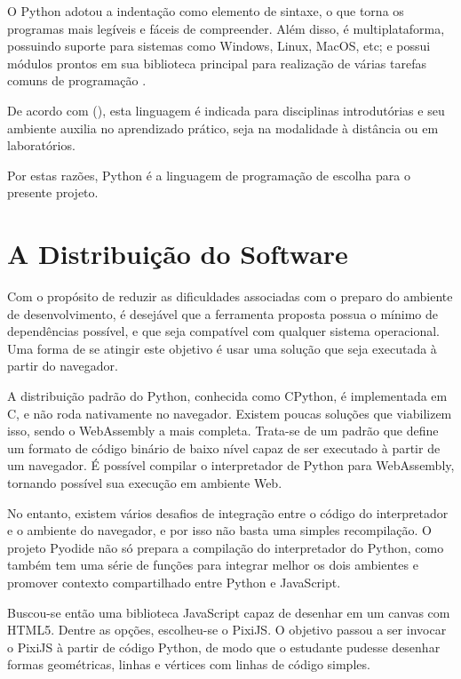 O Python adotou a indentação como elemento de sintaxe, o que torna os programas mais legíveis e fáceis de compreender. Além disso, é multiplataforma, possuindo suporte para sistemas como Windows, Linux, MacOS, etc; e possui módulos prontos em sua biblioteca principal para realização de várias tarefas comuns de programação \cite{moraispires2002}.

De acordo com \citeauthor{fangohr2004} (\citeyear{fangohr2004}), esta linguagem é indicada para disciplinas introdutórias e seu ambiente auxilia no aprendizado prático, seja na modalidade à distância ou em laboratórios.

Por estas razões, Python é a linguagem de programação de escolha para o presente projeto.

\section{A Distribuição do Software}

Com o propósito de reduzir as dificuldades associadas com o preparo do ambiente de desenvolvimento, é desejável que a ferramenta proposta possua o mínimo de dependências possível, e que seja compatível com qualquer sistema operacional. Uma forma de se atingir este objetivo é usar uma solução que seja executada à partir do navegador.

A distribuição padrão do Python, conhecida como CPython, é implementada em C, e não roda nativamente no navegador. Existem poucas soluções que viabilizem isso, sendo o WebAssembly a mais completa. Trata-se de um padrão que define um formato de código binário de baixo nível capaz de ser executado à partir de um navegador. É possível compilar o interpretador de Python para WebAssembly, tornando possível sua execução em ambiente Web.

No entanto, existem vários desafios de integração entre o código do interpretador e o ambiente do navegador, e por isso não basta uma simples recompilação. O projeto Pyodide não só prepara a compilação do interpretador do Python, como também tem uma série de funções para integrar melhor os dois ambientes e promover contexto compartilhado entre Python e JavaScript.

Buscou-se então uma biblioteca JavaScript capaz de desenhar em um canvas com HTML5. Dentre as opções, escolheu-se o PixiJS. O objetivo passou a ser invocar o PixiJS à partir de código Python, de modo que o estudante pudesse desenhar formas geométricas, linhas e vértices com linhas de código simples.

